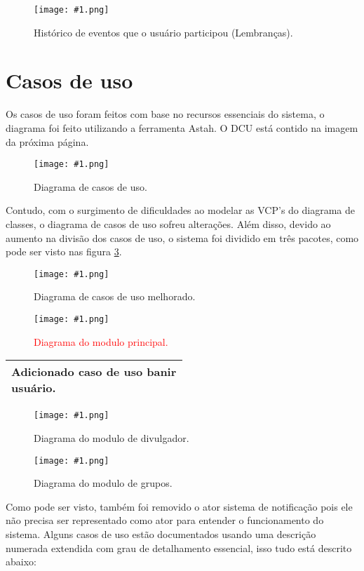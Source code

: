 \documentclass{article}
\newcommand{\diagrama}[2]
{
 \begin{figure}[H]
 \begin{center}
 \texttt{[image: \#1.png]}
 \end{center}
 \caption{#2}
 \label{fig:#1}
 \end{figure}
}
\newcommand{\telasmart}[2]
{
 \begin{figure}[H]
 \begin{center}
 \texttt{[image: \#1.png]}
 \end{center}
 \caption{#2}
 \label{fig:#1}
 \end{figure}
}
\begin{document}
\telasmart{hist_eventos}{Histórico de eventos que o usuário participou (Lembranças).}
 
\section{Casos de uso} \bigskip

Os casos de uso foram feitos com base no recursos essenciais do sistema, o diagrama foi feito utilizando a ferramenta Astah. O DCU está contido na imagem da próxima página.

\diagrama{usecase}{Diagrama de casos de uso.}
\pagebreak


	Contudo, com o surgimento de dificuldades ao modelar as VCP's do diagrama de classes, o diagrama de casos de uso sofreu alterações. Além disso, devido ao aumento na divisão dos casos de uso, o sistema foi dividido em três pacotes, como pode ser visto nas figura \ref{fig:usecase2}.

	\diagrama{usecase2}{Diagrama de casos de uso melhorado.}
	\diagrama{usecase21}{\textcolor{red}{Diagrama do modulo principal.}}
	\begin{center}
 \begin{tabular}{|p{0.5\linewidth}|}
  \hline
  	Adicionado caso de uso banir usuário. \\ 
  \hline
 \end{tabular} 
\end{center}
	\diagrama{usecase22}{Diagrama do modulo de divulgador.}
	\diagrama{usecase23}{Diagrama do modulo de grupos.}
	
	Como pode ser visto, também foi removido o ator sistema de notificação pois ele não precisa ser representado como ator para entender o funcionamento do sistema.
	Alguns casos de uso estão documentados usando uma descrição numerada extendida com grau de detalhamento essencial, isso tudo está descrito abaixo:
\end{document}

